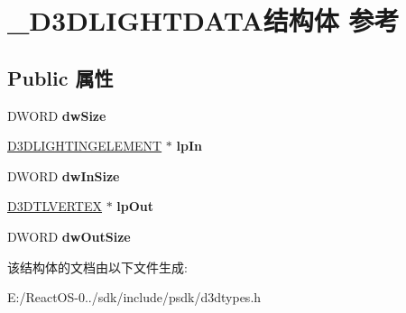 \hypertarget{struct___d3_d_l_i_g_h_t_d_a_t_a}{}\section{\+\_\+\+D3\+D\+L\+I\+G\+H\+T\+D\+A\+T\+A结构体 参考}
\label{struct___d3_d_l_i_g_h_t_d_a_t_a}
\subsection*{Public 属性}
\begin{DoxyCompactItemize}
\item 
\mbox{\label{struct___d3_d_l_i_g_h_t_d_a_t_a_aa44cee01a06dbf17831a6568f553c2f4}} 
D\+W\+O\+RD {\bfseries dw\+Size}
\item 
\mbox{\label{struct___d3_d_l_i_g_h_t_d_a_t_a_aaabac59a52e4f38951e8e24a4a1f1a7f}} 
\hyperlink{struct___d3_d_l_i_g_h_t_i_n_g_e_l_e_m_e_n_t}{D3\+D\+L\+I\+G\+H\+T\+I\+N\+G\+E\+L\+E\+M\+E\+NT} $\ast$ {\bfseries lp\+In}
\item 
\mbox{\label{struct___d3_d_l_i_g_h_t_d_a_t_a_a426be9d06564fabcbfcb885031573c44}} 
D\+W\+O\+RD {\bfseries dw\+In\+Size}
\item 
\mbox{\label{struct___d3_d_l_i_g_h_t_d_a_t_a_aaa08dfe5328ab03ec9ecad2f09e54b0b}} 
\hyperlink{struct___d3_d_t_l_v_e_r_t_e_x}{D3\+D\+T\+L\+V\+E\+R\+T\+EX} $\ast$ {\bfseries lp\+Out}
\item 
\mbox{\label{struct___d3_d_l_i_g_h_t_d_a_t_a_a7ea968a1b5d28797579fd99c4d8e02d3}} 
D\+W\+O\+RD {\bfseries dw\+Out\+Size}
\end{DoxyCompactItemize}


该结构体的文档由以下文件生成\+:\begin{DoxyCompactItemize}
\item 
E\+:/\+React\+O\+S-\/0../sdk/include/psdk/d3dtypes.\+h\end{DoxyCompactItemize}
